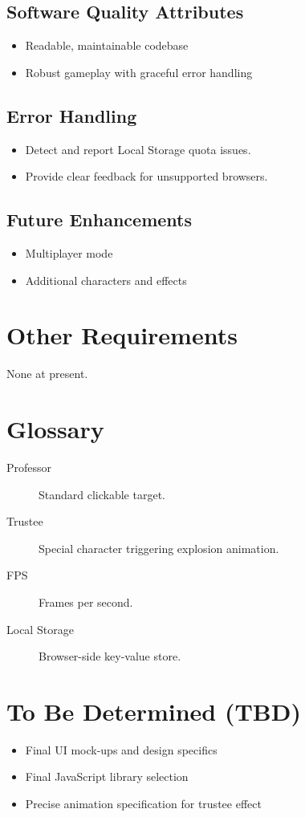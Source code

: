 \documentclass[11pt]{scrreprt}
\begin{document}
\section{Software Quality Attributes}
\begin{itemize}
  \item Readable, maintainable codebase
  \item Robust gameplay with graceful error handling
\end{itemize}

\section{Error Handling}
\begin{itemize}
  \item Detect and report Local Storage quota issues.
  \item Provide clear feedback for unsupported browsers.
\end{itemize}

\section{Future Enhancements}
\begin{itemize}
  \item Multiplayer mode
  \item Additional characters and effects
\end{itemize}

\chapter{Other Requirements}
None at present.

\appendix

\chapter{Glossary}
\begin{description}
  \item[Professor] Standard clickable target.
  \item[Trustee] Special character triggering explosion animation.
  \item[FPS] Frames per second.
  \item[Local Storage] Browser-side key-value store.
\end{description}


\chapter{To Be Determined (TBD)}
\begin{itemize}
  \item Final UI mock-ups and design specifics
  \item Final JavaScript library selection
  \item Precise animation specification for trustee effect
\end{itemize}
\end{document}
